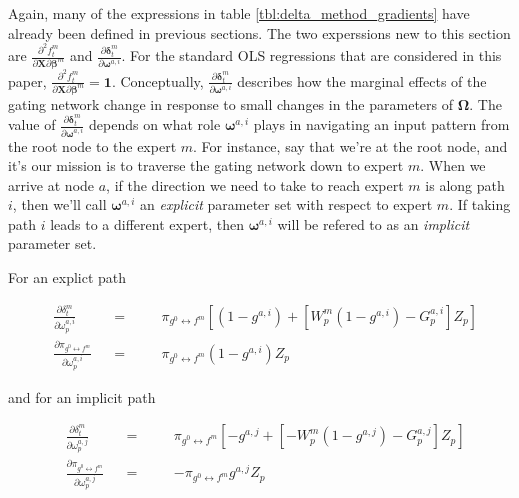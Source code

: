 \documentclass[12pt]{article}
\newcommand{\gateprod}[2]{\pi_{#1 \longleftrightarrow #2}}
\begin{document}
Again, many of the expressions in table \ref{tbl:delta_method_gradients}
have already been defined in previous sections. The two experssions new to this
section are $\frac{\partial^{2} f^{m}_{t}}{\partial \boldsymbol{X} \partial \boldsymbol{\beta}^{m}}$
and  $\frac{\partial \boldsymbol{\delta}^{m}_{t}}{\partial \boldsymbol{\omega}^{a,i}}$.
For the standard OLS regressions that are considered in this paper,
$\frac{\partial^{2} f^{m}_{t}}{\partial \boldsymbol{X} \partial \boldsymbol{\beta}^{m}} = \boldsymbol{1}$.
Conceptually, $\frac{\partial \boldsymbol{\delta}^{m}_{t}}{\partial \boldsymbol{\omega}^{a,i}}$
describes how the marginal effects of the gating network change in response
to small changes in the parameters of $\boldsymbol{\Omega}$. The value of
$\frac{\partial \boldsymbol{\delta}^{m}_{t}}{\partial \boldsymbol{\omega}^{a,i}}$
depends on what role $\boldsymbol{\omega}^{a,i}$ plays in navigating an input
pattern from the root node to the expert $m$. For instance, say that we're
at the root node, and it's our mission is to traverse the gating network down
to expert $m$. When we arrive at node $a$, if the direction we need to take to
reach expert $m$ is along path $i$, then we'll call $\boldsymbol{\omega}^{a,i}$
an \textit{explicit} parameter set with respect to expert $m$. If taking path $i$ leads to a different expert,
then $\boldsymbol{\omega}^{a,i}$ will be refered to as an \textit{implicit}
parameter set.

For an explict path

\begin{subequations} \label{eq:delta_definitions_exp}
  \begin{alignat}{3}
  &\frac{\partial \delta^{m}_{t}}{\partial \omega^{a,i}_{p}}            &&=&\quad& \gateprod{g^{0}}{f^{m}} \left[ (1 - g^{a,i})  +  \left[ W^{m}_{p}  (1 - g^{a,i}) - G^{a,i}_{p}  \right] Z_{p} \right] \label{eq:delta_gate_partial_exp}  \\
  &\frac{\partial \gateprod{g^{0}}{f^{m}}}{\partial \omega^{a,i}_{p}}   &&=&\quad& \gateprod{g^{0}}{f^{m}} (1 - g^{a,i}) Z_{p}
  \end{alignat}
  \end{subequations}

and for an implicit path

\begin{subequations} \label{eq:delta_definitions_imp}
\begin{alignat}{3}
&\frac{\partial \delta^{m}_{t}}{\partial \omega^{a,j}_{p}}            &&=&\quad& \gateprod{g^{0}}{f^{m}} \left[ - g^{a,j}  +  \left[ - W^{m}_{p}  (1 - g^{a,j}) - G^{a,j}_{p}  \right] Z_{p} \right] \label{eq:delta_gate_partial_imp}  \\
&\frac{\partial \gateprod{g^{0}}{f^{m}}}{\partial \omega^{a,j}_{p}}   &&=&\quad& - \gateprod{g^{0}}{f^{m}} g^{a,j} Z_{p}
\end{alignat}
\end{subequations}
\end{document}
